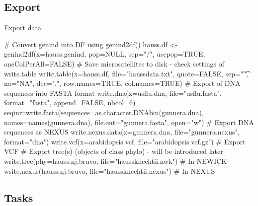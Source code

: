 \documentclass[compress, ucs, xelatex, 11pt, xcolor=svgnames, aspectratio=169,
	hyperref={
		bookmarks=true,
		unicode=true,
		colorlinks=true,
		pdftitle={Molecular data in R},
		plainpages=false,
		pdfauthor={Vojtech Zeisek},
		pdfsubject={Course about phylogeny and evolution in R},
		pdfcreator={XeLaTeX},
		pdfkeywords={R, evolution, phylogeny, molecular data},
		linkcolor=Crimson, %
		anchorcolor=Magenta, %
		citecolor=Magenta, %
		filecolor=Magenta, %
		menucolor=Magenta, %
		urlcolor=DodgerBlue, %
		pdftex},
	url={hyphens, lowtilde} %
	]{beamer}
\begin{document}
\subsection{Export}

\begin{frame}[fragile]{Export data}
	\begin{spluscode}
    # Convert genind into DF using genind2df()
    hauss.df <- genind2df(x=hauss.genind, pop=NULL, sep="/",
      usepop=TRUE, oneColPerAll=FALSE)
    # Save microsatellites to disk - check settings of write.table
    write.table(x=hauss.df, file="haussdata.txt", quote=FALSE,
      sep="\t", na="NA", dec=".", row.names=TRUE, col.names=TRUE)
    # Export of DNA sequences into FASTA format
    write.dna(x=usflu.dna, file="usflu.fasta", format="fasta",
      append=FALSE, nbcol=6)
    seqinr::write.fasta(sequences=as.character.DNAbin(gunnera.dna),
      names=names(gunnera.dna), file.out="gunnera.fasta", open="w")
    # Export DNA sequences as NEXUS
    write.nexus.data(x=gunnera.dna, file="gunnera.nexus", format="dna")
    write.vcf(x=arabidopsis.vcf, file="arabidopsis.vcf.gz") # Export VCF
    # Export tree(s) (objects of class phylo) - will be introduced later
    write.tree(phy=hauss.nj.bruvo, file="haussknechtii.nwk") # In NEWICK
    write.nexus(hauss.nj.bruvo, file="haussknechtii.nexus") # In NEXUS
	\end{spluscode}
\end{frame}

\subsection{Tasks}
\end{document}
